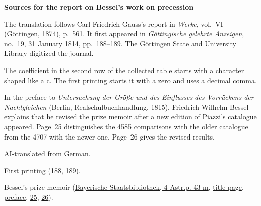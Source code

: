 \clearpage\thispagestyle{empty}
\begin{center}\Large\bfseries Sources for the report on Bessel’s work on precession\end{center}

The translation follows Carl Friedrich Gauss’s report in \emph{Werke}, vol.~VI (Göttingen, 1874), p.~561. It first appeared in \emph{Göttingische gelehrte Anzeigen}, no.~19, 31 January 1814, pp.~188--189. The Göttingen State and University Library digitized the journal.

The coefficient in the second row of the collected table starts with a character shaped like a c. The first printing starts it with a zero and uses a decimal comma.

In the preface to \emph{Untersuchung der Größe und des Einflusses des Vorrückens der Nachtgleichen} (Berlin, Realschulbuchhandlung, 1815), Friedrich Wilhelm Bessel explains that he revised the prize memoir after a new edition of Piazzi’s catalogue appeared. Page~25 distinguishes the 4585 comparisons with the older catalogue from the 4707 with the newer one. Page~26 gives the revised results.

AI-translated from German.

First printing (\href{https://images.p.sub.uni-goettingen.de/iiif/image/gdz:PPN319721507_1814:00000190/full/1650,/0/default.jpg}{188}, \href{https://images.p.sub.uni-goettingen.de/iiif/image/gdz:PPN319721507_1814:00000191/full/1650,/0/default.jpg}{189}).

Bessel’s prize memoir (\href{https://www.digitale-sammlungen.de/de/view/bsb10049066?page=3}{Bayerische Staatsbibliothek, 4 Astr.p. 43 m}, \href{https://api.digitale-sammlungen.de/iiif/image/v2/bsb10049066_00003/full/1700,/0/default.jpg}{title page}, \href{https://api.digitale-sammlungen.de/iiif/image/v2/bsb10049066_00005/full/1700,/0/default.jpg}{preface}, \href{https://api.digitale-sammlungen.de/iiif/image/v2/bsb10049066_00027/full/1700,/0/default.jpg}{25}, \href{https://api.digitale-sammlungen.de/iiif/image/v2/bsb10049066_00028/full/1700,/0/default.jpg}{26}).

\clearpage
